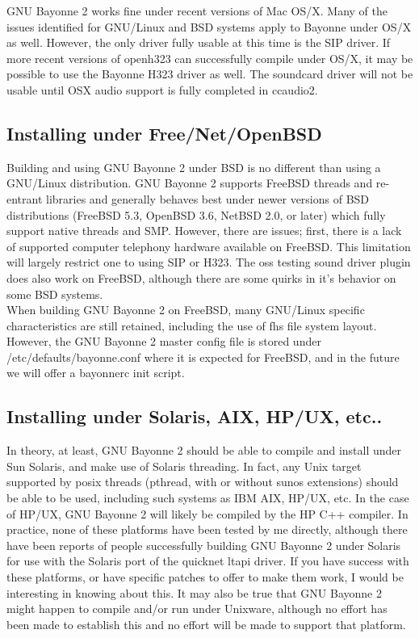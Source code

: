 \documentclass[a4paper,12pt]{article}
\begin{document}
GNU Bayonne 2 works fine under recent versions of Mac OS/X.  Many of the
issues identified for GNU/Linux and BSD systems apply to Bayonne under
OS/X as well.  However, the only driver fully usable at this time is the
SIP driver.  If more recent versions of openh323 can successfully
compile under OS/X, it may be possible to use the Bayonne H323 driver as
well. The soundcard driver will not be usable until OSX audio support
is fully completed in ccaudio2. \\

\subsection{Installing under Free/Net/OpenBSD}

Building and using GNU Bayonne 2 under BSD is no different than using a
GNU/Linux distribution.  GNU Bayonne 2 supports FreeBSD threads and
re-entrant libraries and generally behaves best under newer versions of
BSD distributions (FreeBSD 5.3, OpenBSD 3.6, NetBSD 2.0, or later) which
fully support native threads and SMP.  However, there are issues; first,
there is a lack of supported computer telephony hardware available on
FreeBSD.  This limitation will largely restrict one to using SIP or
H323.  The oss testing sound driver plugin does also work on FreeBSD,
although there are some quirks in it's behavior on some BSD systems. \\

When building GNU Bayonne 2 on FreeBSD, many GNU/Linux specific
characteristics are still retained, including the use of fhs file system
layout.  However, the GNU Bayonne 2 master config file is stored under
/etc/defaults/bayonne.conf where it is expected for FreeBSD, and in the 
future we will offer a bayonnerc init script. \\  

\subsection{Installing under Solaris, AIX, HP/UX, etc..}

In theory, at least, GNU Bayonne 2 should be able to compile and install 
under Sun Solaris, and make use of Solaris threading.  In fact, any Unix
target supported by posix threads (pthread, with or without sunos   
extensions) should be able to be used, including such systems as IBM   
AIX, HP/UX, etc.  In the case of HP/UX, GNU Bayonne 2 will likely be
compiled by the HP C++ compiler.  In practice, none of these platforms
have been tested by me directly, although there have been reports of
people successfully building GNU Bayonne 2 under Solaris for use with the
Solaris port of the quicknet ltapi driver.  If you have success with
these platforms, or have specific patches to offer to make them work, I
would be interesting in knowing about this.  It may also be true that
GNU Bayonne 2 might happen to compile and/or run under Unixware, although
no effort has been made to establish this and no effort will be made to
support that platform. \\
\end{document}
